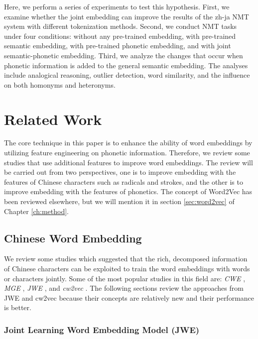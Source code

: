 Here, we perform a series of experiments to test this hypothesis. First, we examine whether the joint embedding can improve the results of the zh-ja NMT system with different tokenization methods. Second, we conduct NMT tasks under four conditions: without any pre-trained embedding, with pre-trained semantic embedding, with pre-trained phonetic embedding, and with joint semantic-phonetic embedding. Third, we analyze the changes that occur when phonetic information is added to the general semantic embedding. The analyses include analogical reasoning, outlier detection, word similarity, and the influence on both homonyms and heteronyms.

\section{Related Work} \label{sec:related_work}

The core technique in this paper is to enhance the ability of word embeddings by utilizing feature engineering on phonetic information. Therefore, we review some studies that use additional features to improve word embeddings. The review will be carried out from two perspectives, one is to improve embedding with the features of Chinese characters such as radicals and strokes, and the other is to improve embedding with the features of phonetics. The concept of Word2Vec \cite{mikolov2013efficient} has been reviewed elsewhere, but we will mention it in section \ref{sec:word2vec} of Chapter \ref{ch:method}.

\subsection{Chinese Word Embedding} \label{sec:rw_cwe}

We review some studies which suggested that the rich, decomposed information of Chinese characters can be exploited to train the word embeddings with words or characters jointly. Some of the most popular studies in this field are: \textit{CWE} \cite{chen2015joint}, \textit{MGE} \cite{yin2016multi}, \textit{JWE} \cite{yu2017joint}, and \textit{cw2vec} \cite{cao2018cw2vec}. The following sections review the approaches from JWE and cw2vec because their concepts are relatively new and their performance is better.

\subsubsection{Joint Learning Word Embedding Model (JWE)}

